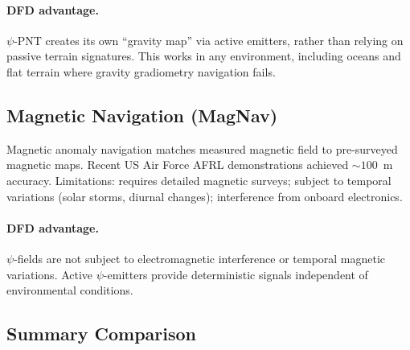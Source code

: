 \documentclass[twocolumn,superscriptaddress,prd,nofootinbib]{revtex4-2}
\begin{document}
\paragraph{DFD advantage.}
$\psi$-PNT creates its own ``gravity map'' via active emitters, rather
than relying on passive terrain signatures. This works in any
environment, including oceans and flat terrain where gravity gradiometry
navigation fails.

\subsection{Magnetic Navigation (MagNav)}

Magnetic anomaly navigation matches measured magnetic field to pre-surveyed
magnetic maps. Recent US Air Force AFRL demonstrations achieved
$\sim 100$~m accuracy. Limitations: requires detailed magnetic surveys;
subject to temporal variations (solar storms, diurnal changes);
interference from onboard electronics.

\paragraph{DFD advantage.}
$\psi$-fields are not subject to electromagnetic interference or temporal
magnetic variations. Active $\psi$-emitters provide deterministic signals
independent of environmental conditions.

\subsection{Summary Comparison}
\end{document}
